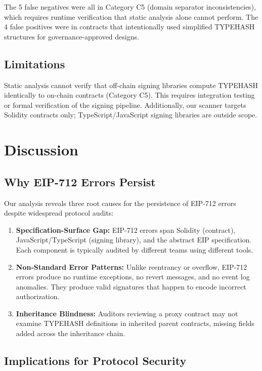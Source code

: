 \documentclass[runningheads]{llncs}
\begin{document}
The 5 false negatives were all in Category C5 (domain separator inconsistencies), which requires runtime verification that static analysis alone cannot perform. The 4 false positives were in contracts that intentionally used simplified TYPEHASH structures for governance-approved designs.

\subsection{Limitations}

Static analysis cannot verify that off-chain signing libraries compute TYPEHASH identically to on-chain contracts (Category C5). This requires integration testing or formal verification of the signing pipeline. Additionally, our scanner targets Solidity contracts only; TypeScript/JavaScript signing libraries are outside scope.

\section{Discussion}

\subsection{Why EIP-712 Errors Persist}

Our analysis reveals three root causes for the persistence of EIP-712 errors despite widespread protocol audits:

\begin{enumerate}
    \item \textbf{Specification-Surface Gap:} EIP-712 errors span Solidity (contract), JavaScript/TypeScript (signing library), and the abstract EIP specification. Each component is typically audited by different teams using different tools.
    \item \textbf{Non-Standard Error Patterns:} Unlike reentrancy or overflow, EIP-712 errors produce no runtime exceptions, no revert messages, and no event log anomalies. They produce valid signatures that happen to encode incorrect authorization.
    \item \textbf{Inheritance Blindness:} Auditors reviewing a proxy contract may not examine TYPEHASH definitions in inherited parent contracts, missing fields added across the inheritance chain.
\end{enumerate}

\subsection{Implications for Protocol Security}
\end{document}
